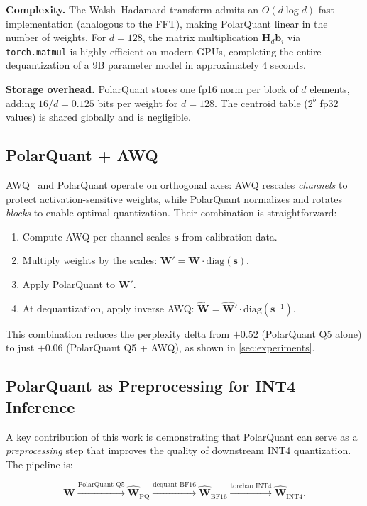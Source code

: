 \documentclass[10pt,twocolumn]{article}
\newcommand{\bH}{\mathbf{H}}
\newcommand{\bW}{\mathbf{W}}
\newcommand{\bb}{\mathbf{b}}
\begin{document}
\textbf{Complexity.} The Walsh--Hadamard transform admits an $O(d \log d)$ fast implementation (analogous to the FFT), making PolarQuant linear in the number of weights. For $d = 128$, the matrix multiplication $\bH_d \bb_i$ via \texttt{torch.matmul} is highly efficient on modern GPUs, completing the entire dequantization of a 9B parameter model in approximately 4 seconds.

\textbf{Storage overhead.} PolarQuant stores one fp16 norm per block of $d$ elements, adding $16/d = 0.125$ bits per weight for $d = 128$. The centroid table ($2^b$ fp32 values) is shared globally and is negligible.

\subsection{PolarQuant + AWQ}
\label{sec:polar_awq}

AWQ~\cite{lin2024awq} and PolarQuant operate on orthogonal axes: AWQ rescales \emph{channels} to protect activation-sensitive weights, while PolarQuant normalizes and rotates \emph{blocks} to enable optimal quantization. Their combination is straightforward:

\begin{enumerate}[leftmargin=*,itemsep=2pt]
  \item Compute AWQ per-channel scales $\mathbf{s}$ from calibration data.
  \item Multiply weights by the scales: $\bW' = \bW \cdot \mathrm{diag}(\mathbf{s})$.
  \item Apply PolarQuant to $\bW'$.
  \item At dequantization, apply inverse AWQ: $\hat{\bW} = \hat{\bW}' \cdot \mathrm{diag}(\mathbf{s}^{-1})$.
\end{enumerate}

This combination reduces the perplexity delta from $+0.52$ (PolarQuant Q5 alone) to just $+0.06$ (PolarQuant Q5 + AWQ), as shown in \cref{sec:experiments}.

\subsection{PolarQuant as Preprocessing for INT4 Inference}
\label{sec:preprocessing}

A key contribution of this work is demonstrating that PolarQuant can serve as a \emph{preprocessing} step that improves the quality of downstream INT4 quantization. The pipeline is:

\begin{equation}
  \bW \xrightarrow{\text{PolarQuant Q5}} \hat{\bW}_{\text{PQ}} \xrightarrow{\text{dequant BF16}} \hat{\bW}_{\text{BF16}} \xrightarrow{\text{torchao INT4}} \hat{\bW}_{\text{INT4}}.
  \label{eq:pipeline}
\end{equation}
\end{document}

